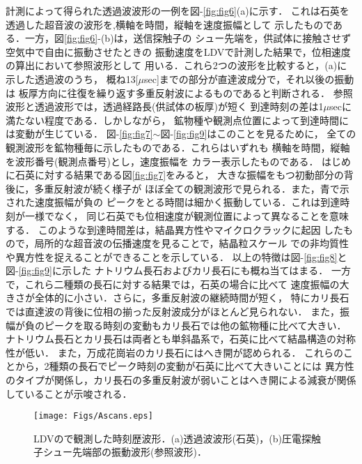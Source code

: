 ﻿%
計測によって得られた透過波波形の一例を図-\ref{fig:fig6}(a)に示す．
これは石英を透過した超音波の波形を,横軸を時間，縦軸を速度振幅として
示したものである．一方，図\ref{fig:fig6}-(b)は，送信探触子の
シュー先端を，供試体に接触させず空気中で自由に振動させたときの
振動速度をLDVで計測した結果で，位相速度の算出において参照波形として
用いる．これら2つの波形を比較すると，(a)に示した透過波のうち，
概ね13[$\mu$sec]までの部分が直達波成分で，それ以後の振動は
板厚方向に往復を繰り返す多重反射波によるものであると判断される．
参照波形と透過波形では，透過経路長(供試体の板厚)が短く
到達時刻の差は1$\mu$secに満たない程度である．しかしながら，
鉱物種や観測点位置によって到達時間には変動が生じている．
図-\ref{fig:fig7}$\sim$図-\ref{fig:fig9}はこのことを見るために，
全ての観測波形を鉱物種毎に示したものである．これらはいずれも
横軸を時間，縦軸を波形番号(観測点番号)とし，速度振幅を
カラー表示したものである．
はじめに石英に対する結果である図\ref{fig:fig7}をみると，
大きな振幅をもつ初動部分の背後に，多重反射波が続く様子が
ほぼ全ての観測波形で見られる．また，青で示された速度振幅が負の
ピークをとる時間は細かく振動している．これは到達時刻が一様でなく，
同じ石英でも位相速度が観測位置によって異なることを意味する．
このような到達時間差は，結晶異方性やマイクロクラックに起因
したもので，局所的な超音波の伝播速度を見ることで，結晶粒スケール
での非均質性や異方性を捉えることができることを示している．
以上の特徴は図-\ref{fig:fig8}と図-\ref{fig:fig9}に示した
ナトリウム長石およびカリ長石にも概ね当てはまる．
一方で，これら二種類の長石に対する結果では，石英の場合に比べて
速度振幅の大きさが全体的に小さい．さらに，多重反射波の継続時間が短く，
特にカリ長石では直達波の背後に位相の揃った反射波成分がほとんど見られない．
また，振幅が負のピークを取る時刻の変動もカリ長石では他の鉱物種に比べて大きい．
ナトリウム長石とカリ長石は両者とも単斜晶系で，石英に比べて結晶構造の対称性が低い．
また，万成花崗岩のカリ長石にはへき開が認められる．
これらのことから，2種類の長石でピーク時刻の変動が石英に比べて大きいことには
異方性のタイプが関係し，カリ長石の多重反射波が弱いことはへき開による減衰が関係
していることが示唆される．
\begin{figure}
\begin{center}
	\texttt{[image: Figs/Ascans.eps]}
\caption{
	LDVので観測した時刻歴波形．(a)透過波波形(石英)，(b)圧電探触子シュー先端部の振動波形(参照波形)．
}
\label{fig:fig5}
\end{center}
\end{figure}
